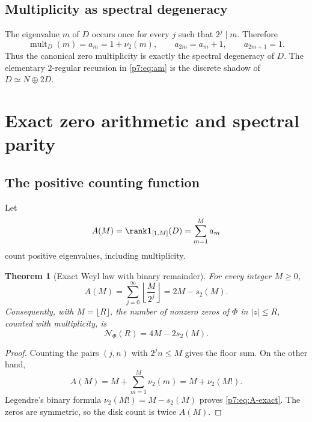\documentclass[11pt]{article}
\numberwithin{equation}{section}
\newtheorem{theorem}{Theorem}[section]
\theoremstyle{definition}
\theoremstyle{remark}
\begin{document}
\subsection{Multiplicity as spectral degeneracy}

The eigenvalue $m$ of $D$ occurs once for every $j$ such that $2^j\mid m$.  Therefore
\begin{equation}\label{p7:eq:am}
 \operatorname{mult}_D(m)=a_m=1+\nu_2(m),
 \qquad
 a_{2m}=a_m+1,
 \qquad
 a_{2m+1}=1.
\end{equation}
Thus the canonical zero multiplicity is exactly the spectral degeneracy of $D$.  The elementary $2$-regular recursion in \cref{p7:eq:am} is the discrete shadow of $D\simeq N\oplus2D$.

\section{Exact zero arithmetic and spectral parity}

\subsection{The positive counting function}

Let
\[
 A(M)=\rank\mathbf 1_{[1,M]}(D)
 =\sum_{m=1}^{M}a_m
\]
count positive eigenvalues, including multiplicity.

\begin{theorem}[Exact Weyl law with binary remainder]\label{p7:thm:counting}
For every integer $M\ge0$,
\begin{equation}\label{p7:eq:A-exact}
 \boxed{\ A(M)=\sum_{j=0}^{\infty}\left\lfloor\frac{M}{2^j}\right\rfloor
 =2M-s_2(M).\ }
\end{equation}
Consequently, with $M=\lfloor R\rfloor$, the number of nonzero zeros of $\Phi$ in $|z|\le R$, counted with multiplicity, is
\begin{equation}\label{p7:eq:Nphi}
 \boxed{\ \mathcal N_\Phi(R)=4M-2s_2(M).\ }
\end{equation}
\end{theorem}

\begin{proof}
Counting the pairs $(j,n)$ with $2^jn\le M$ gives the floor sum.  On the other hand,
\[
 A(M)=M+\sum_{m=1}^{M}\nu_2(m)
 =M+\nu_2(M!).
\]
Legendre's binary formula $\nu_2(M!)=M-s_2(M)$ proves \cref{p7:eq:A-exact}.  The zeros are symmetric, so the disk count is twice $A(M)$.
\end{proof}
\end{document}
